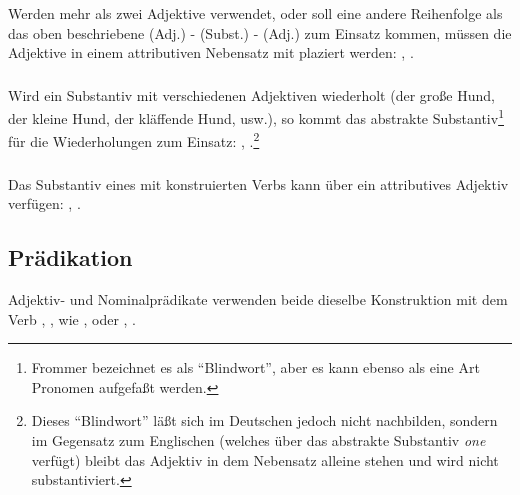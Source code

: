 \subsubsection{} Werden mehr als zwei Adjektive verwendet, oder soll eine andere
Reihenfolge als das oben beschriebene (Adj.) - (Subst.) - (Adj.) zum Einsatz kommen,
m\"ussen die Adjektive in einem attributiven Nebensatz mit  plaziert werden:
, .

\subsubsection{} Wird ein Substantiv mit verschiedenen Adjektiven wiederholt (der
gro\ss{}e Hund, der kleine Hund, der kl\"affende Hund, usw.), so kommt das
abstrakte Substantiv\footnote{Frommer bezeichnet es als "`Blindwort"', aber es kann
ebenso als eine Art Pronomen aufgefa\ss{}t werden.}  f\"ur die Wiederholungen
zum Einsatz: ,
.\footnote{Dieses "`Blindwort"' l\"a\ss{}t sich im Deutschen jedoch
nicht nachbilden, sondern im Gegensatz zum Englischen (welches \"uber das abstrakte
Substantiv \textit{one} verf\"ugt) bleibt das Adjektiv in dem Nebensatz alleine stehen
und wird nicht substantiviert.}\label{syn:pum:adj}

\subsubsection{} Das Substantiv eines mit  konstruierten Verbs kann \"uber
ein attributives Adjektiv verf\"ugen: , .


\subsection{Pr\"adikation} Adjektiv- und Nominalpr\"adikate verwenden beide dieselbe
Konstruktion mit dem Verb , , wie
,
 oder
, .
\label{syn:predicates}

